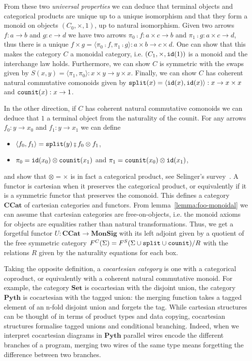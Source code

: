 From these two \emph{universal properties} we can deduce that terminal objects and categorical products are unique up to a unique isomorphism and that they form a monoid on objects $(C_0, \times, 1)$, up to natural isomorphism.
Given two arrows $f : a \to b$ and $g : c \to d$ we have two arrows $\pi_0 \fcmp f : a \times c \to b$ and $\pi_1 \fcmp g : a \times c \to d$, thus there is a unique $f \times  g = \langle \pi_0 \fcmp f, \pi_1 \fcmp g \rangle : a \times b \to c \times d$.
One can show that this makes the category $C$ a monoidal category, i.e. $(C_1, \times, \mathtt{id}(1))$ is a monoid and the interchange law holds.
Furthermore, we can show $C$ is symmetric with the swaps given by $S(x, y) = \langle \pi_1, \pi_0 \rangle : x \times y \to y \times x$.
Finally, we can show $C$ has coherent natural commutative comonoids given by $\mathtt{split}(x) = \langle \mathtt{id}(x), \mathtt{id}(x) \rangle : x \to x \times x$ and $\mathtt{counit}(x) : x \to 1$.

In the other direction, if $C$ has coherent natural commutative comonoids we can deduce that $1$ a terminal object from the naturality of the counit.
For any arrows $f_0 : y \to x_0$ and $f_1 : y \to x_1$ we can define
\begin{itemize}
\item $\langle f_0, f_1 \rangle = \ttsplit(y) \fcmp f_0 \otimes f_1$,
\item $\pi_0 = \mathtt{id}(x_0) \otimes \mathtt{counit}(x_1)$ and $\pi_1 = \mathtt{counit}(x_0) \otimes \mathtt{id}(x_1)$,
\end{itemize}
and show that $\otimes = \times$ is in fact a categorical product, see Selinger's survey~\cite[Section 6.1]{Selinger10}.
A functor is cartesian when it preserves the categorical product, or equivalently if it is a symmetric functor that preserves the comonoid.
This defines a category $\mathbf{CCat}$ of cartesian categories and functors.
From lemma~\ref{lemma:foo-monoidal} we can assume that cartesian categories are free-on-objects, i.e. the monoid axioms for objects are equalities rather than natural transformations.
Thus, we get a forgetful functor $U : \mathbf{CCat} \to \mathbf{MonSig}$ with its left adjoint given by a quotient of the free symmetric category $F^C(\Sigma) = F^S(\Sigma \cup \mathtt{split} \cup \mathtt{counit}) / R$ with the relations $R$ given by the naturality equations for each box.

Taking the opposite definition, a \emph{cocartesian category} is one with a categorical coproduct, or equivalently with a coherent natural commutative monoid.
For example, the category $\mathbf{Set}$ is cocartesian with the disjoint union, the category $\mathbf{Pyth}$ is cocartesian with the tagged union: the merging function takes a tagged element of an n-fold disjoint union and forgets the tag.
While cartesian structures can be thought of in terms of product types and data copying, cocartesian structures formalise tagged unions and conditional branching.
Indeed, when we interpret cocartesian diagrams in $\mathbf{Pyth}$ parallel wires encode the different branches of a program, merging two wires of the same type means forgetting the difference between two branches.

